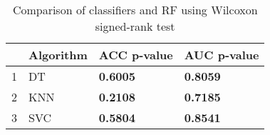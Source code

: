 \begin{table}
\footnotesize
\caption{Comparison of classifiers and RF using Wilcoxon signed-rank test}
\label{tab:wilcoxon comparison}
\begin{tabular}{llll}
\hline
 & Algorithm & ACC p-value & AUC p-value \\
\hline
1 & DT & \textbf{0.6005} & \textbf{0.8059} \\
2 & KNN & \textbf{0.2108} & \textbf{0.7185} \\
3 & SVC & \textbf{0.5804} & \textbf{0.8541} \\
\hline
\end{tabular}
\end{table}
